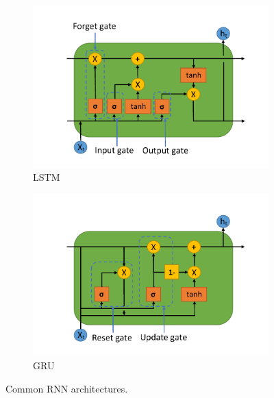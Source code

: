 \begin{figure}[H]
    \centering
    \begin{subfigure}[t]{0.49\textwidth}
        \centering
        \includegraphics[width=\textwidth]{PICs/temproalModelsSOTA/LSTM.pdf}
        \caption{\ac{LSTM} \cite{LSTM2014}}
        \label{fig:LSTMGRUSOTA_a}
    \end{subfigure}
    \hfill
    \begin{subfigure}[t]{0.49\textwidth}
        \centering
        \includegraphics[width=\textwidth]{PICs/temproalModelsSOTA/GRU.pdf}
        \caption{\ac{GRU} \cite{GRU2014}}
        \label{fig:LSTMGRUSOTA_b}
    \end{subfigure}
    \caption{Common \ac{RNN} architectures.}
    \label{fig:LSTMGRUSOTA}
\end{figure}

